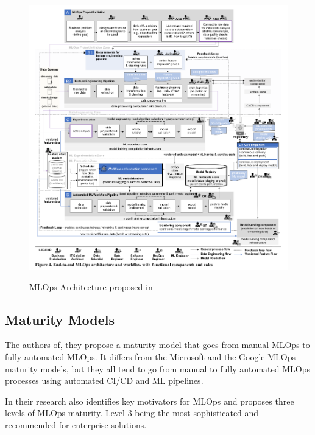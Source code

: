\begin{figure}[!htbp]
    \caption{MLOps Architecture proposed in \cite{Kreuzberger2022MachineLO}}
    \centering
    \includegraphics[scale=0.5]{images/kreuz-end-to-end-workflow}
    \label{fig:end-to-end-workflow}
\end{figure}

\subsection{Maturity Models}\label{subsec:matutiry-models}
The authors of\cite{mlops-maturity-model}, they propose a maturity model that goes from manual MLOps to fully automated MLOps.
It differs from the Microsoft and the Google MLOps maturity models,
but they all tend to go from manual to fully automated MLOps processes using automated CI/CD and
ML pipelines.\cite{mlops-definition-tools-and-challenge}

In their research\cite{inproceedings} also identifies key motivators for MLOps and proposes three levels of MLOps maturity.
Level 3 being the most sophisticated and recommended for enterprise solutions.

